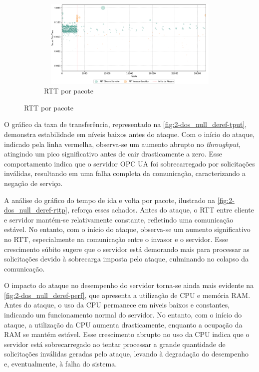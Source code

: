 \begin{figure}[htbp!]
\begin{subfigure}[t]{0.5\textwidth}
                \end{subfigure}%
                ~
                \begin{subfigure}[t]{0.5\textwidth}
                    \centering
                    \caption{\label{fig:2-dos_null_deref-rttp}RTT por pacote}
                    \includegraphics[width=1\textwidth, height=120pt]{USPSC-img/output/cropped/2-dos_function_call_null_deref-rttp.png}
                \end{subfigure}%
            \end{figure}

            O gráfico da taxa de transferência, representado na \autoref{fig:2-dos_null_deref-tput}, demonstra estabilidade em níveis baixos antes do ataque. Com o início do ataque, indicado pela linha vermelha, observa-se um aumento abrupto no \textit{throughput}, atingindo um pico significativo antes de cair drasticamente a zero. Esse comportamento indica que o servidor OPC UA foi sobrecarregado por solicitações inválidas, resultando em uma falha completa da comunicação, caracterizando a negação de serviço.

            A análise do gráfico do tempo de ida e volta por pacote, ilustrado na \autoref{fig:2-dos_null_deref-rttp}, reforça esses achados. Antes do ataque, o RTT entre cliente e servidor mantém-se relativamente constante, refletindo uma comunicação estável. No entanto, com o início do ataque, observa-se um aumento significativo no RTT, especialmente na comunicação entre o invasor e o servidor. Esse crescimento súbito sugere que o servidor está demorando mais para processar as solicitações devido à sobrecarga imposta pelo ataque, culminando no colapso da comunicação.

            O impacto do ataque no desempenho do servidor torna-se ainda mais evidente na \autoref{fig:2-dos_null_deref-perf}, que apresenta a utilização de CPU e memória RAM. Antes do ataque, o uso da CPU permanece em níveis baixos e constantes, indicando um funcionamento normal do servidor. No entanto, com o início do ataque, a utilização da CPU aumenta drasticamente, enquanto a ocupação da RAM se mantém estável. Esse crescimento abrupto no uso da CPU indica que o servidor está sobrecarregado ao tentar processar a grande quantidade de solicitações inválidas geradas pelo ataque, levando à degradação do desempenho e, eventualmente, à falha do sistema.

